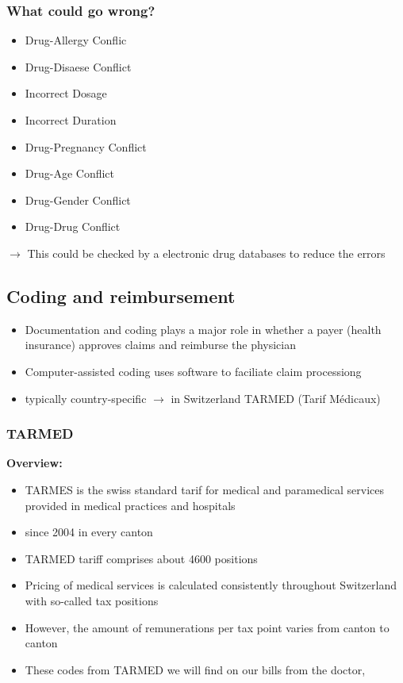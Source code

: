 \documentclass{report}
\theoremstyle{definition}
\theoremstyle{example}
\begin{document}
      \subsubsection{What could go wrong?}
   \begin{itemize}
      \item Drug-Allergy Conflic
      \item Drug-Disaese Conflict
      \item Incorrect Dosage
      \item Incorrect Duration
      \item Drug-Pregnancy Conflict
      \item Drug-Age Conflict
      \item Drug-Gender Conflict
      \item Drug-Drug Conflict
   \end{itemize}
   $\rightarrow$ This could be checked by a electronic drug databases to reduce the errors

   \subsection{Coding and reimbursement}
   \begin{itemize}
      \item Documentation and coding plays a major role in whether a payer (health insurance) approves claims and reimburse the physician
      \item Computer-assisted coding uses software to faciliate claim processiong
      \item typically country-specific $\rightarrow$ in Switzerland TARMED (Tarif Médicaux)
   \end{itemize}
   
      \subsubsection{TARMED}
      \textbf{Overview:}
      \begin{itemize}
         \item TARMES is the swiss standard tarif for medical and paramedical services provided in medical practices and hospitals
         \item since 2004 in every canton
         \item TARMED tariff comprises about 4600 positions
         \item Pricing of medical services is calculated consistently throughout Switzerland with so-called tax positions
         \item However, the amount of remunerations per tax point varies from canton to canton
         \item These codes from TARMED we will find on our bills from the doctor, 
      \end{itemize}
\end{document}
